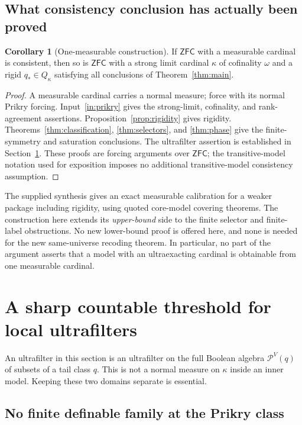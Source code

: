 \documentclass[11pt,letterpaper]{article}
\theoremstyle{definition}
\newtheorem{corollary}[definition]{Corollary}
\numberwithin{equation}{section}
\newcommand{\ZFC}{\mathsf{ZFC}}
\newcommand{\Pow}{\mathcal P}
\begin{document}
\subsection{What consistency conclusion has actually been proved}

\begin{corollary}[One-measurable construction]\label{cor:consistency}
If $\ZFC$ with a measurable cardinal is consistent, then so is $\ZFC$ with
a strong limit cardinal $\kappa$ of cofinality $\omega$ and a rigid
$q_*\in Q_\kappa$ satisfying all conclusions of Theorem~\ref{thm:main}.
\end{corollary}

\begin{proof}
A measurable cardinal carries a normal measure; force with its normal
Prikry forcing. Input~\ref{in:prikry} gives the strong-limit, cofinality,
and rank-agreement assertions. Proposition~\ref{prop:rigidity} gives
rigidity. Theorems~\ref{thm:classification}, \ref{thm:selectors}, and
\ref{thm:phase} give the finite-symmetry and saturation conclusions.
The ultrafilter assertion is established in Section~\ref{sec:ultrafilters}.
These proofs are forcing arguments over $\ZFC$; the transitive-model
notation used for exposition imposes no additional transitive-model
consistency assumption.
\end{proof}

The supplied synthesis gives an exact measurable calibration for a weaker
package including rigidity, using quoted core-model covering theorems.
The construction here extends its \emph{upper-bound} side to the finite
selector and finite-label obstructions. No new lower-bound proof is offered
here, and none is needed for the new same-universe recoding theorem.
In particular, no part of the argument asserts that a model with an
ultraexacting cardinal is obtainable from one measurable cardinal.

\section{A sharp countable threshold for local ultrafilters}\label{sec:ultrafilters}

An ultrafilter in this section is an ultrafilter on the full Boolean algebra
$\Pow^V(q)$ of subsets of a tail class $q$. This is not a normal measure on
$\kappa$ inside an inner model. Keeping these two domains separate is
essential.

\subsection{No finite definable family at the Prikry class}
\end{document}
